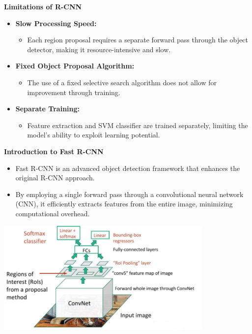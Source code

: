 \documentclass{beamer}
\begin{document}
\begin{frame}{\textbf{Limitations of R-CNN}}
    \begin{itemize}
        \item \textbf{Slow Processing Speed:}
        \begin{itemize}
            \item Each region proposal requires a separate forward pass through the object detector, making it resource-intensive and slow.
        \end{itemize}

        \item \textbf{Fixed Object Proposal Algorithm:}
        \begin{itemize}
            \item The use of a fixed selective search algorithm does not allow for improvement through training.
        \end{itemize}
        
        \item \textbf{Separate Training:}
        \begin{itemize}
            \item Feature extraction and SVM classifier are trained separately, limiting the model's ability to exploit learning potential.
        \end{itemize}
    \end{itemize}
\end{frame}


\begin{frame}{\textbf{Introduction to Fast R-CNN}}
    \begin{itemize}
        \item Fast R-CNN is an advanced object detection framework that enhances the original R-CNN approach.
        \item By employing a single forward pass through a convolutional neural network (CNN), it efficiently extracts features from the entire image, minimizing computational overhead.
    \end{itemize}
    \vfill
    \begin{center}
        \includegraphics[width=0.8\textwidth]{slide9.png} %
    \end{center}
\end{frame}
\end{document}
